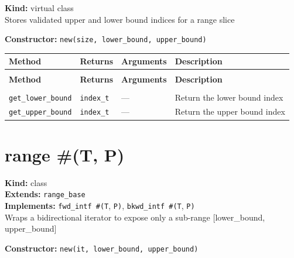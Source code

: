 \documentclass[11pt,letterpaper]{report}
\begin{document}
\noindent\textbf{Kind:} virtual class\\
\noindent Stores validated upper and lower bound indices for a range slice

\noindent\textbf{Constructor:} \texttt{new(size, lower\_bound, upper\_bound)}

\begin{xltabular}{\linewidth}{>{\small}p{1.35in} >{\small}p{1.25in} >{\small}p{0.95in} >{\small}X}
\toprule
\textbf{Method} & \textbf{Returns} & \textbf{Arguments} & \textbf{Description} \\
\midrule
\endfirsthead
{} \\
\midrule
\textbf{Method} & \textbf{Returns} & \textbf{Arguments} & \textbf{Description} \\
\midrule
\endhead
\midrule
{} \\
\endfoot
\bottomrule
\endlastfoot
\texttt{get\_lower\_bound} & \texttt{index\_t} & --- & Return the lower bound index \\
\texttt{get\_upper\_bound} & \texttt{index\_t} & --- & Return the upper bound index \\
\end{xltabular}

\section{range \#(T, P)}
\label{cls:rangeTP}

\noindent\textbf{Kind:} class\\
\noindent\textbf{Extends:} \texttt{range\_base}\\
\noindent\textbf{Implements:} \texttt{fwd\_intf \#(T}, \texttt{P)}, \texttt{bkwd\_intf \#(T}, \texttt{P)}\\
\noindent Wraps a bidirectional iterator to expose only a sub-range [lower\_bound, upper\_bound]

\noindent\textbf{Constructor:} \texttt{new(it, lower\_bound, upper\_bound)}
\end{document}
